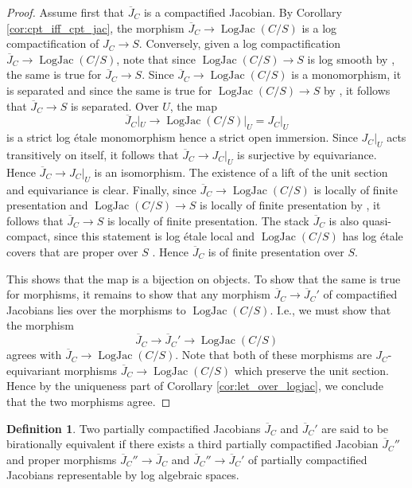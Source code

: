 \documentclass[11pt]{amsart}
\theoremstyle{definition}
\newtheorem{definition}[theorem]{Definition}
\theoremstyle{remark}
\DeclareMathOperator{\LogJac}{LogJac}
\begin{document}
\begin{proof}
	Assume first that $\overline{J}_C$ is a compactified Jacobian.
	By Corollary \ref{cor:cpt_iff_cpt_jac}, the morphism $\overline{J}_C\to \LogJac(C/S)$
	is a log compactification of $J_C\to S$. Conversely,
	given a log compactification $\overline{J}_C\to \LogJac(C/S)$,
	note that since $\LogJac(C/S)\to S$ is log smooth by \cite[Corollary 4.11.4]{TheLogarithmicMolcho2022}, the same
	is true for $\overline{J}_C\to S$. Since $\overline{J}_C\to \LogJac(C/S)$
	is a monomorphism, it is separated and since the same is true
	for $\LogJac(C/S)\to S$ by \cite[Theorem 4.12.1]{TheLogarithmicMolcho2022},
	it follows that $\overline{J}_C\to S$ is separated. Over
	$U$, the map
	$$\overline{J}_C |_U\to \LogJac(C/S)|_U=J_C|_U$$
	is a strict log étale monomorphism hence a strict open immersion. Since $J_C|_U$
	acts transitively on itself, it follows that $\overline{J}_C\to J_C|_U$ is surjective
	by equivariance. Hence $\overline{J}_C\to J_C|_U$ is an isomorphism.
	The existence of a lift of the unit section and equivariance
	is clear. Finally, since $\overline{J}_C\to \LogJac(C/S)$ is locally
	of finite presentation and $\LogJac(C/S)\to S$ is locally of
	finite presentation by \cite[Corollary 4.2.3]{TheLogarithmicMolcho2022},
	it follows that $\overline{J}_C\to S$ is locally of
	finite presentation. The stack $\overline{J}_C$ is also
	quasi-compact, since this statement is log étale local and
	$\LogJac(C/S)$ has log étale covers that are proper over $S$
	\cite{LogarithmicAbeKajiwa2015}. Hence $\overline{J}_C$
	is of finite presentation over $S$.

	This shows that the map is a bijection on objects.
	To show that the same is true for morphisms, it remains to
	show that any morphism $\overline{J}_C\to \overline{J}_C'$ of
	compactified Jacobians lies over the
	morphisms to $\LogJac(C/S)$. I.e., we must show that the morphism
	$$\overline{J}_C\to \overline{J}_C'\to \LogJac(C/S)$$
	agrees with $\overline{J}_C\to \LogJac(C/S)$. Note that both of these
	morphisms are $J_C$-equivariant morphisms $\overline{J}_C\to \LogJac(C/S)$
	which preserve the unit section. Hence by the uniqueness part
	of Corollary \ref{cor:let_over_logjac}, we conclude that the two morphisms agree.
\end{proof}

\begin{definition}
	Two partially compactified Jacobians $\overline{J}_C$ and $\overline{J}_C'$ are said
	to be birationally equivalent if there exists a third partially
	compactified Jacobian $\overline{J}_C''$ and proper morphisms $\overline{J}_C''\to \overline{J}_C$ and $\overline{J}_C''\to \overline{J}_C'$
	of partially compactified Jacobians representable by log algebraic spaces.
\end{definition}
\end{document}
